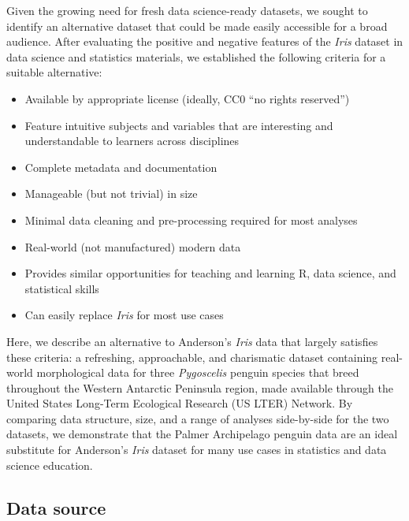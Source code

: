 Given the growing need for fresh data science-ready datasets, we sought
to identify an alternative dataset that could be made easily accessible
for a broad audience. After evaluating the positive and negative
features of the \emph{Iris} dataset in data science and statistics
materials, we established the following criteria for a suitable
alternative:

\begin{itemize}
\tightlist
\item
  Available by appropriate license (ideally, CC0 ``no rights reserved'')
\item
  Feature intuitive subjects and variables that are interesting and
  understandable to learners across disciplines
\item
  Complete metadata and documentation
\item
  Manageable (but not trivial) in size
\item
  Minimal data cleaning and pre-processing required for most analyses
\item
  Real-world (not manufactured) modern data
\item
  Provides similar opportunities for teaching and learning R, data
  science, and statistical skills
\item
  Can easily replace \emph{Iris} for most use cases
\end{itemize}

Here, we describe an alternative to Anderson's \emph{Iris} data that
largely satisfies these criteria: a refreshing, approachable, and
charismatic dataset containing real-world morphological data for three
\emph{Pygoscelis} penguin species that breed throughout the Western
Antarctic Peninsula region, made available through the United States
Long-Term Ecological Research (US LTER) Network. By comparing data
structure, size, and a range of analyses side-by-side for the two
datasets, we demonstrate that the Palmer Archipelago penguin data are an
ideal substitute for Anderson's \emph{Iris} dataset for many use cases
in statistics and data science education.

\hypertarget{data-source}{%
\subsection{Data source}\label{data-source}}

